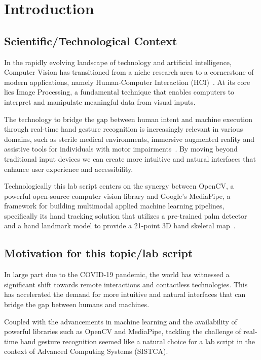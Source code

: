 \section{Introduction}
\subsection{Scientific/Technological Context}

In the rapidly evolving landscape of technology and artificial intelligence, Computer Vision has transitioned from a niche research area to a cornerstone of modern applications, namely Human-Computer Interaction (HCI)~\cite{kumari2025hand}.
At its core lies Image Processing, a fundamental technique that enables computers to interpret and manipulate meaningful data from visual inputs.

The technology to bridge the gap between human intent and machine execution through real-time hand gesture recognition is increasingly relevant in various domains, such as sterile medical environments, immersive augmented reality and assistive tools for individuals with motor impairments~\cite{mopidevi2023hand}.
By moving beyond traditional input devices we can create more intuitive and natural interfaces that enhance user experience and accessibility.

Technologically this lab script centers on the synergy between OpenCV, a powerful open-source computer vision library and Google's MediaPipe, a framework for building multimodal applied machine learning pipelines, specifically its hand tracking solution that utilizes a pre-trained palm detector and a hand landmark model to provide a 21-point 3D hand skeletal map~\cite{biswas2024mediapipe, mediapipe_hands}.

\subsection{Motivation for this topic/lab script}

In large part due to the COVID-19 pandemic, the world has witnessed a significant shift towards remote interactions and contactless technologies.
This has accelerated the demand for more intuitive and natural interfaces that can bridge the gap between humans and machines.

Coupled with the advancements in machine learning and the availability of powerful libraries such as OpenCV and MediaPipe, tackling the challenge of real-time hand gesture recognition seemed like a natural choice for a lab script in the context of Advanced Computing Systems (SISTCA).


